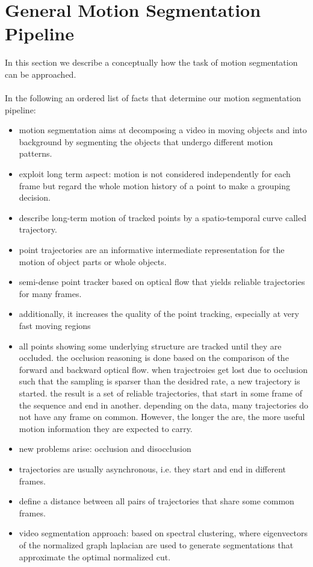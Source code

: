 \section{General Motion Segmentation Pipeline}
%
In this section we describe a conceptually how the task of motion segmentation can be approached. \\ \\
In the following an ordered list of facts that determine our motion segmentation pipeline:
\begin{itemize}
  \item motion segmentation aims at decomposing a video in moving objects and into background by segmenting the objects that undergo different motion patterns.
  \item exploit long term aspect: motion is not considered independently for each frame but regard the whole motion history of a point to make a grouping decision.
  \item describe long-term motion of tracked points by a spatio-temporal curve called trajectory.
  \item point trajectories are an informative intermediate representation for the motion of object parts or whole objects.
  \item semi-dense point tracker based on optical flow that yields reliable trajectories for many frames.
  \item additionally, it increases the quality of the point tracking, especially at very fast moving regions
  \item all points showing some underlying structure are tracked until they are occluded. the occlusion reasoning is done based on the comparison of the forward and backward optical flow. when trajectroies get lost due to occlusion such that the sampling is sparser than the desidred rate, a new trajectory is started. the result is a set of reliable trajectories, that start in some frame of the sequence and end in another. depending on the data, many trajectories do not have any frame on common. However, the longer the are, the more useful motion information they are expected to carry.
  \item new problems arise: occlusion and disocclusion
  \item trajectories are usually asynchronous, i.e. they start and end in different frames.
  \item define a distance between all pairs of trajectories that share some common frames. 
  \item video segmentation approach: based on spectral clustering, where eigenvectors of the normalized graph laplacian are used to generate segmentations that approximate the optimal normalized cut.
\end{itemize}

